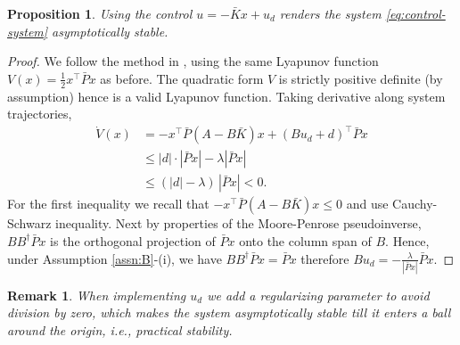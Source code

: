 \documentclass[10pt,a4paper]{amsart}
\newtheorem{proposition}{Proposition}
\newtheorem{remark}{Remark}
\newcommand{\tp}{^\top}
\begin{document}
\begin{proposition}
Using the control $u = -\bar{K}x + u_d$ renders the system \eqref{eq:control-system} asymptotically stable. 
\end{proposition}
\begin{proof}
We follow the method in \cite[Chapter 14.2]{khalil}, using the same Lyapunov function $V(x) = \frac{1}{2} x\tp \bar{P}x$ as before. 
The quadratic form $V$ is strictly positive definite (by assumption) hence is a valid Lyapunov function. Taking derivative along system trajectories, 
\begin{align*}
\dot{V}(x) &= -x\tp \bar{P}(A - B\bar{K})x  +  (Bu_d + d)\tp \bar{P} x \\
& \le  | d | \cdot | \bar{P}x| -\lambda |\bar{P} x| \\
& \le  (|d| - \lambda ) \, | \bar{P}x| < 0.
\end{align*}
For the first inequality we recall that $-x\tp \bar{P}(A - B\bar{K})x \le 0$ and use Cauchy-Schwarz inequality. 
Next by properties of the Moore-Penrose pseudoinverse, $BB^{\dagger}\bar{P}x$ is the orthogonal projection of $\bar{P}x$ onto the column span of $B$. 
Hence, under Assumption \ref{assn:B}-(i), we have $BB^{\dagger}\bar{P}x = \bar{P}x$ therefore $Bu_d = - \frac{\lambda}{| \bar{P}x|} \bar{P}x$.
\end{proof}
 \begin{remark}
     When implementing $u_d$ we add a regularizing parameter to avoid division by zero, which makes the system asymptotically stable till it enters a ball around the origin, i.e., practical stability. 
 \end{remark}
\end{document}
